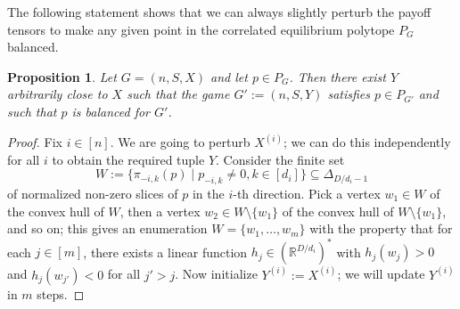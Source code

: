 \documentclass[11pt]{amsart}
\newtheorem{proposition}[theorem]{Proposition}
\theoremstyle{definition}
\numberwithin{subcase}{case}
\newcommand{\RR}{{\mathbb R}}
\begin{document}
The following statement shows that we can always slightly perturb the payoff tensors to make any given point in the correlated equilibrium polytope $P_G$ balanced.
\begin{proposition}
\label{PropositionBalancing}
Let $G=(n,S,X)$ and let $p \in P_G$. Then there
exist $Y$ arbitrarily close to $X$ such that the game $G':=(n,S,Y)$
satisfies $p \in P_{G'}$ and such that $p$ is balanced for $G'$.
\end{proposition}

\begin{proof}
Fix $i \in [n]$. We are going to perturb $X^{(i)}$; we can do this
independently for all $i$ to obtain the required tuple $Y$.  Consider the
finite set
\[ W:=\{\pi_{-i,k}(p) \mid p_{-i,k} \neq 0, k \in [d_i]\} \subseteq
\Delta_{D/d_i-1} \]
of normalized non-zero slices of $p$ in the $i$-th direction. Pick a
vertex $w_1 \in W$ of the convex hull of $W$, then a vertex $w_2 \in W
\setminus \{w_1\}$ of the convex hull of $W \setminus \{w_1\}$, and so
on; this gives an enumeration $W=\{w_1,\ldots,w_m\}$ with the property
that for each $j \in [m]$, there exists a linear function $h_j \in
(\RR^{D/d_i})^*$ with $h_j(w_j)>0$ and $h_j(w_{j'})<0$ for all $j'>j$.
Now initialize $Y^{(i)}:=X^{(i)}$; we will update $Y^{(i)}$ in $m$
steps.


\end{proof}
\end{document}
